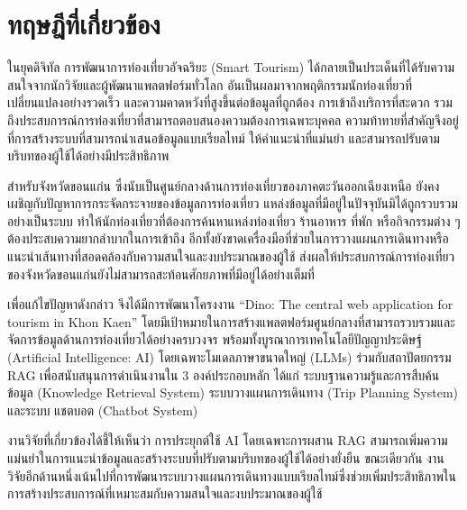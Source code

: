 
\section{ทฤษฎีที่เกี่ยวข้อง}

ในยุคดิจิทัล การพัฒนาการท่องเที่ยวอัจฉริยะ (Smart Tourism) ได้กลายเป็นประเด็นที่ได้รับความสนใจจากนักวิจัยและผู้พัฒนาแพลตฟอร์มทั่วโลก อันเป็นผลมาจากพฤติกรรมนักท่องเที่ยวที่เปลี่ยนแปลงอย่างรวดเร็ว และความคาดหวังที่สูงขึ้นต่อข้อมูลที่ถูกต้อง การเข้าถึงบริการที่สะดวก รวมถึงประสบการณ์การท่องเที่ยวที่สามารถตอบสนองความต้องการเฉพาะบุคคล \parencite{sousa2024} ความท้าทายที่สำคัญจึงอยู่ที่การสร้างระบบที่สามารถนำเสนอข้อมูลแบบเรียลไทม์ ให้คำแนะนำที่แม่นยำ และสามารถปรับตามบริบทของผู้ใช้ได้อย่างมีประสิทธิภาพ

สำหรับจังหวัดขอนแก่น ซึ่งนับเป็นศูนย์กลางด้านการท่องเที่ยวของภาคตะวันออกเฉียงเหนือ ยังคงเผชิญกับปัญหาการกระจัดกระจายของข้อมูลการท่องเที่ยว แหล่งข้อมูลที่มีอยู่ในปัจจุบันมิได้ถูกรวบรวมอย่างเป็นระบบ ทำให้นักท่องเที่ยวที่ต้องการค้นหาแหล่งท่องเที่ยว ร้านอาหาร ที่พัก หรือกิจกรรมต่าง ๆ ต้องประสบความยากลำบากในการเข้าถึง อีกทั้งยังขาดเครื่องมือที่ช่วยในการวางแผนการเดินทางหรือแนะนำเส้นทางที่สอดคล้องกับความสนใจและงบประมาณของผู้ใช้ ส่งผลให้ประสบการณ์การท่องเที่ยวของจังหวัดขอนแก่นยังไม่สามารถสะท้อนศักยภาพที่มีอยู่ได้อย่างเต็มที่

เพื่อแก้ไขปัญหาดังกล่าว จึงได้มีการพัฒนาโครงงาน ``Dino: The central web application for tourism in Khon Kaen'' โดยมีเป้าหมายในการสร้างแพลตฟอร์มศูนย์กลางที่สามารถรวบรวมและจัดการข้อมูลด้านการท่องเที่ยวได้อย่างครบวงจร พร้อมทั้งบูรณาการเทคโนโลยีปัญญาประดิษฐ์ (Artificial Intelligence: AI) โดยเฉพาะโมเดลภาษาขนาดใหญ่ (LLMs) ร่วมกับสถาปัตยกรรม RAG เพื่อสนับสนุนการดำเนินงานใน 3 องค์ประกอบหลัก ได้แก่ ระบบฐานความรู้และการสืบค้นข้อมูล (Knowledge Retrieval System) ระบบวางแผนการเดินทาง (Trip Planning System) และระบบ แชตบอต (Chatbot System)

งานวิจัยที่เกี่ยวข้องได้ชี้ให้เห็นว่า การประยุกต์ใช้ AI โดยเฉพาะการผสาน RAG สามารถเพิ่มความแม่นยำในการแนะนำข้อมูลและสร้างระบบที่ปรับตามบริบทของผู้ใช้ได้อย่างยั่งยืน \parencite{banerjee2025} ขณะเดียวกัน งานวิจัยอีกด้านหนึ่งเน้นไปที่การพัฒนาระบบวางแผนการเดินทางแบบเรียลไทม์ซึ่งช่วยเพิ่มประสิทธิภาพในการสร้างประสบการณ์ที่เหมาะสมกับความสนใจและงบประมาณของผู้ใช้ \parencite{deshmukh2025}


